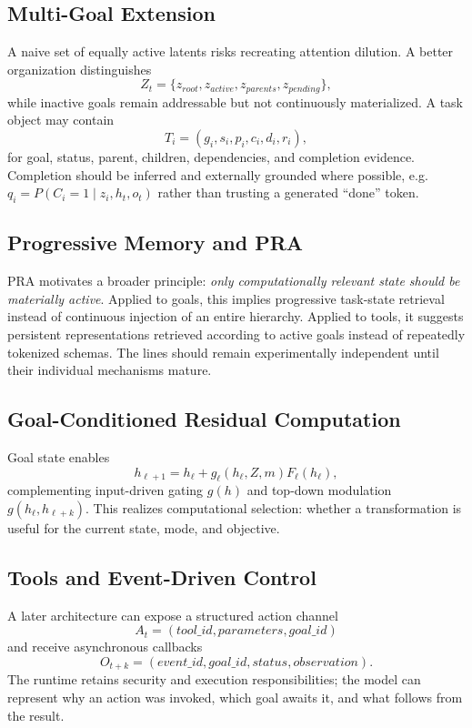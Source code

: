 \documentclass[11pt]{article}
\begin{document}
\subsection{Multi-Goal Extension}
A naive set of equally active latents risks recreating attention dilution. A better organization distinguishes
\begin{equation}
Z_t=\{z_{root},z_{active},z_{parents},z_{pending}\},
\end{equation}
while inactive goals remain addressable but not continuously materialized. A task object may contain
\begin{equation}
T_i=(g_i,s_i,p_i,c_i,d_i,r_i),
\end{equation}
for goal, status, parent, children, dependencies, and completion evidence. Completion should be inferred and externally grounded where possible, e.g. $q_i=P(C_i=1\mid z_i,h_t,o_t)$ rather than trusting a generated ``done'' token.

\subsection{Progressive Memory and PRA}
PRA motivates a broader principle: \emph{only computationally relevant state should be materially active}. Applied to goals, this implies progressive task-state retrieval instead of continuous injection of an entire hierarchy. Applied to tools, it suggests persistent representations retrieved according to active goals instead of repeatedly tokenized schemas. The lines should remain experimentally independent until their individual mechanisms mature.

\subsection{Goal-Conditioned Residual Computation}
Goal state enables
\begin{equation}
h_{\ell+1}=h_\ell+g_\ell(h_\ell,Z,m)F_\ell(h_\ell),
\end{equation}
complementing input-driven gating $g(h)$ and top-down modulation $g(h_\ell,h_{\ell+k})$. This realizes computational selection: whether a transformation is useful for the current state, mode, and objective.

\subsection{Tools and Event-Driven Control}
A later architecture can expose a structured action channel
\begin{equation}
A_t=(tool\_id,parameters,goal\_id)
\end{equation}
and receive asynchronous callbacks
\begin{equation}
O_{t+k}=(event\_id,goal\_id,status,observation).
\end{equation}
The runtime retains security and execution responsibilities; the model can represent why an action was invoked, which goal awaits it, and what follows from the result.
\end{document}

